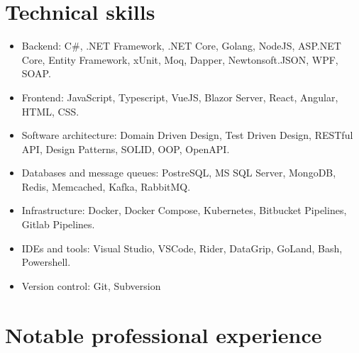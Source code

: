 \documentclass{article}
\begin{document}
\section*{Technical skills}

\begin{itemize}
    \item {
        Backend: C\#, .NET Framework, .NET Core, Golang, NodeJS, ASP.NET Core, Entity Framework, xUnit, Moq, Dapper, Newtonsoft.JSON, WPF, SOAP.
    }
    \item {
        Frontend: JavaScript, Typescript, VueJS, Blazor Server, React, Angular, HTML, CSS.
    }
    \item {
        Software architecture: Domain Driven Design, Test Driven Design, RESTful API, Design Patterns, SOLID, OOP, OpenAPI.
    }
    \item {
        Databases and message queues: PostreSQL, MS SQL Server, MongoDB, Redis, Memcached, Kafka, RabbitMQ.
    }
    \item {
        Infrastructure: Docker, Docker Compose, Kubernetes, Bitbucket Pipelines, Gitlab Pipelines.
    }
    \item {
        IDEs and tools: Visual Studio, VSCode, Rider, DataGrip, GoLand, Bash, Powershell.
    }
    \item {
        Version control: Git, Subversion
    }
\end{itemize}

\section*{Notable professional experience}
\end{document}
